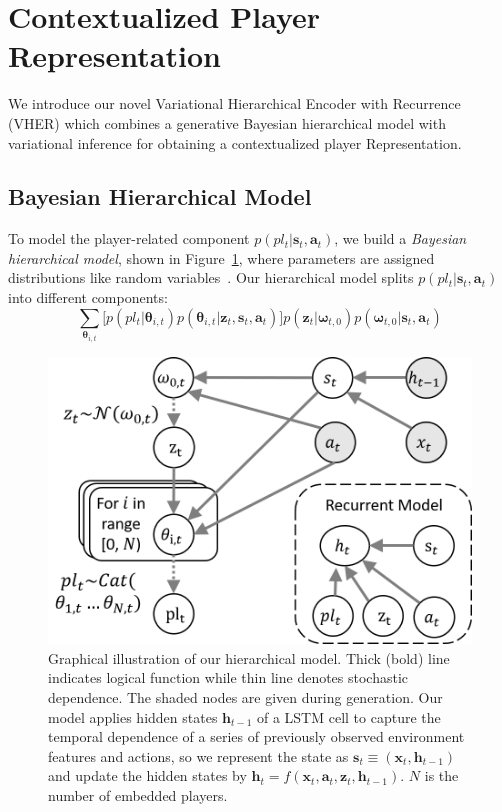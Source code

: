 \documentclass[letterpaper]{article} %
\newcommand{\latentvariables}{\mathbf{z}}
\newcommand{\generation}{p}
\newcommand{\hiddenstate}{\mathbf{h}}
\newcommand{\state}{\mathbf{s}}
\newcommand{\action}{\mathbf{a}}
\newcommand{\player}{pl}
\newcommand{\pindex}{i}
\newcommand{\features}{\mathbf{x}}
\newcommand{\GaussianParameters}{\boldsymbol{\omega}}
\newcommand{\BernoulliParameters}{\boldsymbol{\theta}}
\begin{document}
\section{Contextualized Player Representation}
We introduce our novel Variational Hierarchical Encoder with Recurrence (VHER) which combines a generative Bayesian hierarchical model with variational inference for obtaining a contextualized player Representation. 

\subsection{Bayesian Hierarchical Model}

To model the player-related component $ \generation(\player_{t}|\state_{t},\action_{t})$, we build a {\em Bayesian hierarchical model}, shown in  Figure~\ref{fig:hierarchical-model}, where parameters are assigned distributions like random variables~\cite{McCallum1998,kruschke2014doing}. Our hierarchical model splits $ \generation(\player_{t}|\state_{t},\action_{t})$ into different components:
$$%
\sum_{\BernoulliParameters_{\pindex,t}}\big[\generation(\player_{t}|\BernoulliParameters_{\pindex,t})\generation(\BernoulliParameters_{\pindex,t}|\latentvariables_{t},\state_{t},\action_{t})\big]\generation(\latentvariables_{t}|\GaussianParameters_{t,0})\generation(\GaussianParameters_{t,0}|\state_{t},\action_{t})\nonumber
$$


\begin{figure}[t]
    \centering
    \includegraphics[width=0.8\columnwidth] 
    {./figures/hierarchical-model-graph.png}
    \caption{Graphical illustration of our hierarchical model. Thick (bold) line indicates logical function while thin line denotes stochastic dependence. The shaded nodes are given during generation. Our model applies hidden states $\hiddenstate_{t-1}$ of a LSTM cell to capture the temporal dependence of a series of previously observed environment features and actions, so we represent the state as $\state_t \equiv (\features_{t},\hiddenstate_{t-1})$ and update the hidden states by $\hiddenstate_{t}=f(\features_{t},\action_{t},\latentvariables_{t},\hiddenstate_{t-1})$. $N$ is the number of embedded players.
    } 
    \label{fig:hierarchical-model}
\end{figure} 
\end{document}
